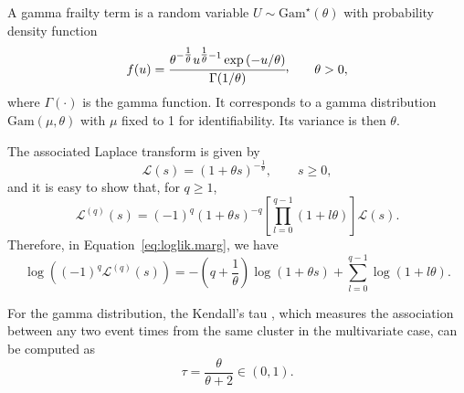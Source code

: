 A gamma frailty term is a random variable $U \sim \mathrm{Gam}^\star (\theta)$ with probability density function
\begin{equation*}
f ( u ) = \cfrac{
    \theta^{-\tfrac{1}{\theta}} u^{\tfrac{1}{\theta} - 1} \exp \left( - u / \theta  \right)
  }{
    \Gamma ( 1 / \theta )
  }\ccom \qquad \theta > 0,
\end{equation*}
  where $\Gamma ( \cdot )$ is the gamma function.
  It corresponds to a gamma distribution $\mathrm{Gam}(\mu,\theta)$ with $\mu$ fixed to 1
  for identifiability.
Its variance is then $\theta$. 

The associated Laplace transform is given by
\begin{equation*}
  \mathcal L(s) = (1 + \theta s )^{- \tfrac{1}{\theta}},
  \qquad s \ge 0,
\end{equation*}
and it is easy to show that, for $q \geq 1$,
\[
  \mathcal{L}^{(q)} ( s ) = ( - 1 )^{q} \left( 1 + \theta s \right)^{- q} 
    \left[ \prod_{l=0}^{q - 1} (1 + l \theta) \right]
    \mathcal{L} ( s ).
\label{gamma}       
\]
Therefore, in Equation~\ref{eq:loglik.marg}, we have
\begin{equation}
\label{eqn:gamma}
\log \left( ( - 1 )^{q} \mathcal{L}^{( q )} ( s ) \right) = - \left( q + \frac{1}{\theta} \right) \log ( 1 + \theta s ) + \sum_{l = 0}^{q - 1} \log ( 1 + l \theta ).
\end{equation}


For the gamma distribution, the Kendall's tau \cite[Section~4.2]{Hougaard00},
	which measures the association between any two event times from the same cluster in the multivariate case, 
	can be computed as
\begin{equation*}
\tau = \frac\theta{\theta + 2} \in (0, 1).
\end{equation*}